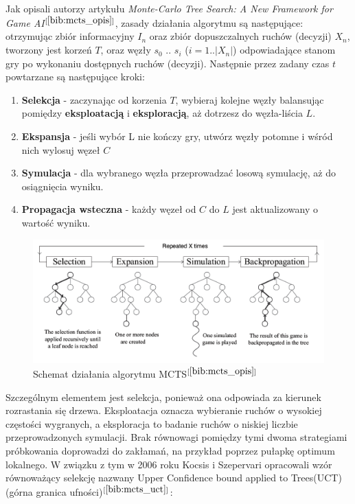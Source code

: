 Jak opisali autorzy artykułu \textit{Monte-Carlo Tree Search: A New Framework for Game AI}$^{[\ref{bib:mcts_opis}]}$, zasady działania algorytmu są następujące: otrzymując zbiór informacyjny $I_n$ oraz zbiór dopuszczalnych ruchów (decyzji) $X_n$, tworzony jest korzeń $T$, oraz węzły $s_0$ .. $s_i$ ($i=1..|X_n|$) odpowiadające stanom gry po wykonaniu dostępnych ruchów (decyzji). Następnie przez zadany czas $t$ powtarzane są następujące kroki:
\begin{enumerate}
	\item \textbf{Selekcja} - zaczynając od korzenia $T$, wybieraj kolejne węzły balansując pomiędzy \textbf{eksploatacją} i \textbf{eksploracją}, aż dotrzesz do węzła-liścia $L$.
	\item \textbf{Ekspansja} - jeśli wybór L nie kończy gry, utwórz węzły potomne i wśród nich wylosuj węzeł $C$
	\item \textbf{Symulacja} - dla wybranego węzła przeprowadzać losową symulację, aż do osiągnięcia wyniku.
	\item \textbf{Propagacja wsteczna} - każdy węzeł od $C$ do $L$ jest aktualizowany o wartość wyniku.
\end{enumerate}
\begin{figure}[h]
	\centering
	\includegraphics[width=\textwidth]{Resources/mcts.png}
	\caption{Schemat działania algorytmu MCTS$^{[\ref{bib:mcts_opis}]}$} 
	\label{fig:llMainImage}
\end{figure}
Szczególnym elementem jest selekcja, ponieważ ona odpowiada za kierunek rozrastania się drzewa. Eksploatacja oznacza wybieranie ruchów o wysokiej częstości wygranych, a eksploracja to badanie ruchów o niskiej liczbie przeprowadzonych symulacji. Brak równowagi pomiędzy tymi dwoma strategiami próbkowania doprowadzi do zakłamań, na przykład poprzez pułapkę optimum lokalnego. W związku z tym w 2006 roku Kocsis i Szepervari opracowali wzór równoważący selekcję nazwany Upper Confidence bound applied to Trees(UCT) (górna granica ufności)$^{[\ref{bib:mcts_uct}]}$:
